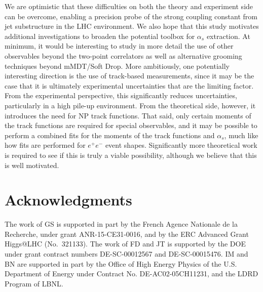 \documentclass[11pt]{cernrep}
\begin{document}
We are optimistic that these difficulties on both the theory and experiment side can be overcome, enabling a precision probe of the strong coupling constant from jet substructure in the LHC environment.
%
We also hope that this study motivates additional investigations to broaden the potential toolbox for $\alpha_s$ extraction.
%
At minimum, it would be interesting to study in more detail the use of other observables beyond the two-point correlators as well as alternative grooming techniques beyond mMDT/Soft Drop.
%
More ambitiously, one potentially interesting direction is the use of track-based measurements, since it may be the case that it is ultimately experimental uncertainties that are the limiting factor.
%
From the experimental perspective, this significantly reduces uncertainties, particularly in a high pile-up environment.
%
From the theoretical side, however, it introduces the need for NP track functions.
%
That said, only certain moments of the track functions are required for special observables, and it may be possible to perform a combined fits for the moments of the track functions and $\alpha_s$, much like how fits are performed for $e^+e^-$ event shapes.
%
Significantly more theoretical work is required to see if this is truly a viable possibility, although we believe that this is well motivated.


\section*{Acknowledgments}

The work of GS is supported in part by the French Agence Nationale de la Recherche,
under grant ANR-15-CE31-0016, and by the ERC Advanced Grant Higgs@LHC
(No.\ 321133).
%
The work of FD and JT is supported by the DOE under grant contract numbers DE-SC-00012567 and DE-SC-00015476.
%
IM and BN are supported in part by the Office of High Energy Physics of the U.S. Department of Energy under Contract No. DE-AC02-05CH11231, and the LDRD Program of LBNL.


\end{document}
